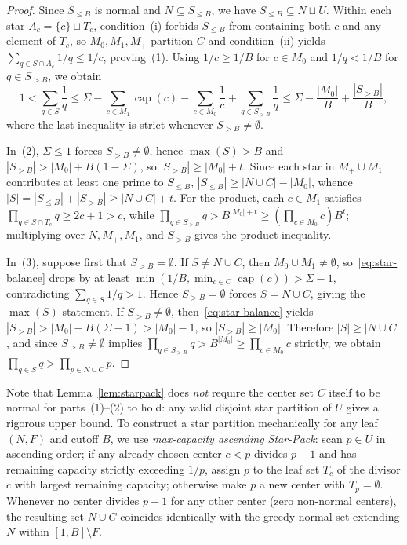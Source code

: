 \documentclass[11pt]{article}
\theoremstyle{remark}
\newcommand{\capf}{\operatorname{cap}}
\begin{document}
\begin{proof}
Since $S_{\le B}$ is normal and $N \subseteq S_{\le B}$, we have
$S_{\le B} \subseteq N \sqcup U$. Within each star $A_c = \{c\}\sqcup T_c$,
condition~(i) forbids $S_{\le B}$ from containing both $c$ and any element of
$T_c$, so $M_0, M_1, M_+$ partition $C$ and condition~(ii) yields
$\sum_{q\in S\cap A_c} 1/q \le 1/c$, proving~(1). Using $1/c \ge 1/B$ for
$c \in M_0$ and $1/q < 1/B$ for $q \in S_{>B}$, we obtain
\begin{equation}\label{eq:star-balance}
  1 < \sum_{q\in S}\frac{1}{q}
  \le \Sigma - \sum_{c\in M_1}\capf(c) - \sum_{c\in M_0}\frac{1}{c}
      + \sum_{q\in S_{>B}}\frac{1}{q}
  \le \Sigma - \frac{|M_0|}{B} + \frac{|S_{>B}|}{B},
\end{equation}
where the last inequality is strict whenever $S_{>B} \neq \emptyset$.

In~(2), $\Sigma \le 1$ forces $S_{>B} \neq \emptyset$, hence $\max(S) > B$ and
$|S_{>B}| > |M_0| + B(1 - \Sigma)$, so $|S_{>B}| \ge |M_0| + t$. Since each star
in $M_+ \cup M_1$ contributes at least one prime to $S_{\le B}$,
$|S_{\le B}| \ge |N \cup C| - |M_0|$, whence $|S| = |S_{\le B}| + |S_{>B}|
\ge |N \cup C| + t$. For the product, each $c \in M_1$ satisfies
$\prod_{q \in S\cap T_c} q \ge 2c + 1 > c$, while
$\prod_{q\in S_{>B}} q > B^{|M_0|+t} \ge (\prod_{c\in M_0} c) B^t$; multiplying
over $N, M_+, M_1$, and $S_{>B}$ gives the product inequality.

In~(3), suppose first that $S_{>B} = \emptyset$. If $S \neq N \cup C$, then
$M_0 \cup M_1 \neq \emptyset$, so~\eqref{eq:star-balance} drops by at least
$\min(1/B, \min_{c\in C}\capf(c)) > \Sigma - 1$, contradicting
$\sum_{q\in S} 1/q > 1$. Hence $S_{>B} = \emptyset$ forces $S = N \cup C$,
giving the $\max(S)$ statement. If $S_{>B} \neq \emptyset$,
then~\eqref{eq:star-balance} yields $|S_{>B}| > |M_0| - B(\Sigma - 1) > |M_0| - 1$,
so $|S_{>B}| \ge |M_0|$. Therefore $|S| \ge |N \cup C|$, and since
$S_{>B} \neq \emptyset$ implies $\prod_{q\in S_{>B}} q > B^{|M_0|} \ge \prod_{c\in M_0} c$
strictly, we obtain $\prod_{q\in S} q > \prod_{p\in N\cup C} p$.
\end{proof}

Note that Lemma~\ref{lem:starpack} does \emph{not} require the center set $C$
itself to be normal for parts~(1)--(2) to hold: any valid disjoint star
partition of $U$ gives a rigorous upper bound. To construct a star partition
mechanically for any leaf $(N,F)$ and cutoff $B$, we use \emph{max-capacity
ascending Star-Pack}: scan $p \in U$ in ascending order; if any already chosen
center $c < p$ divides $p - 1$ and has remaining capacity strictly exceeding
$1/p$, assign $p$ to the leaf set $T_c$ of the divisor $c$ with largest
remaining capacity; otherwise make $p$ a new center with $T_p = \emptyset$.
Whenever no center divides $p - 1$ for any other center (zero non-normal
centers), the resulting set $N \cup C$ coincides identically with the greedy
normal set extending $N$ within $[1,B]\setminus F$.
\end{document}
